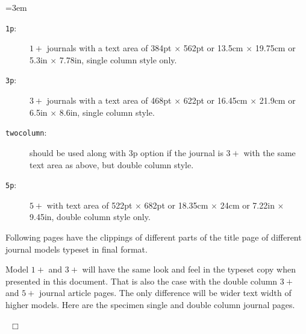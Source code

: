 \documentclass[a4paper,12pt]{article}
\begin{document}
\lmrgn=3em
\begin{description}
\item [\texttt{1p}:] $1+$ journals with a text area of
384pt $\times$ 562pt or 13.5cm $\times$ 19.75cm or 5.3in $\times$
7.78in, single column style only.

\item [\texttt{3p}:] $3+$ journals with a text area of 468pt
$\times$ 622pt or 16.45cm $\times$ 21.9cm or 6.5in $\times$
8.6in, single column style.

\item [\texttt{twocolumn}:] should be used along with 3p option if the
journal is $3+$ with the same text area as above, but double column
style. 

\item [\texttt{5p}:] $5+$ with text area of 522pt $\times$
682pt or 18.35cm $\times$ 24cm or 7.22in $\times$ 9.45in,
double column style only.
\end{description}

Following pages have the clippings of different parts of
the title page of different journal models typeset in final
format.

Model $1+$ and $3+$  will have the same look and
feel in the typeset copy when presented in this document. That is
also the case with the double column $3+$ and $5+$ journal article
pages. The only difference will be wider text width of
higher models.  Here are the specimen single and double column journal 
pages.



\begin{comment}
\begin{center}
\hypertarget{bsc}{}
\hyperlink{sc}{
{\bf [Specimen single column article -- Click here]}
}


\hypertarget{bsc}{}
\hyperlink{dc}{
{\bf [Specimen double column article -- Click here]}
}
\end{center}
\end{comment}

\vspace*{-.5pc}

\enlargethispage*{\baselineskip}

\src{}\hypertarget{sc}{}
\def\rulecolor{blue!70}
\hyperlink{bsc}{}
\def\rulecolor{orange}

\src{}\hypertarget{dc}{}
\def\rulecolor{blue!70}
\hyperlink{bsc}{}
\def\rulecolor{orange}

~\hfill $\Box$
\end{document}
